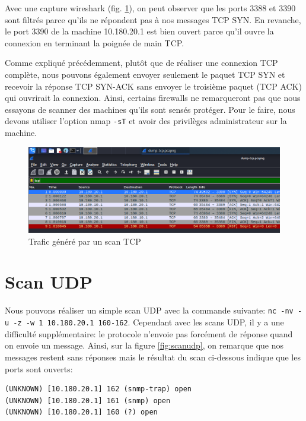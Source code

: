 \documentclass[french,paper=a4,oneside,captions=tableheading]{article}
\begin{document}
Avec une capture wireshark (fig. \ref{fig:scantcp}), on peut observer que les ports 3388 et 3390 sont filtrés parce qu'ils ne répondent pas à nos messages TCP SYN. En revanche, le port 3390 de la machine 10.180.20.1 est bien ouvert parce qu'il ouvre la connexion en terminant la poignée de main TCP.

Comme expliqué précédemment, plutôt que de réaliser une connexion TCP complète, nous pouvons également envoyer seulement le paquet TCP SYN et recevoir la réponse TCP SYN-ACK sans envoyer le troisième paquet (TCP ACK) qui ouvrirait la connexion. Ainsi, certains firewalls ne remarqueront pas que nous essayons de scanner des machines qu'ils sont sensés protéger. Pour le faire, nous devons utiliser l'option nmap \texttt{-sT} et avoir des privilèges administrateur sur la machine.

\begin{figure}[H]
    \centering
    \includegraphics[width=0.95\linewidth]{images/scan-tcp.png}
    \caption{Trafic généré par un scan TCP}
    \label{fig:scantcp}
\end{figure}














\section{Scan UDP}

Nous pouvons réaliser un simple scan UDP avec la commande suivante: \texttt{nc -nv -u -z -w 1 10.180.20.1 160-162}. Cependant avec les scans UDP, il y a une difficulté supplémentaire: le protocole n'envoie pas forcément de réponse quand on envoie un message. Ainsi, sur la figure \ref{fig:scanudp}, on remarque que nos messages restent sans réponses mais le résultat du scan ci-dessous indique que les ports sont ouverts:

\begin{example}
\begin{Verbatim}
(UNKNOWN) [10.180.20.1] 162 (snmp-trap) open
(UNKNOWN) [10.180.20.1] 161 (snmp) open
(UNKNOWN) [10.180.20.1] 160 (?) open
\end{Verbatim}
\end{example}
\end{document}
